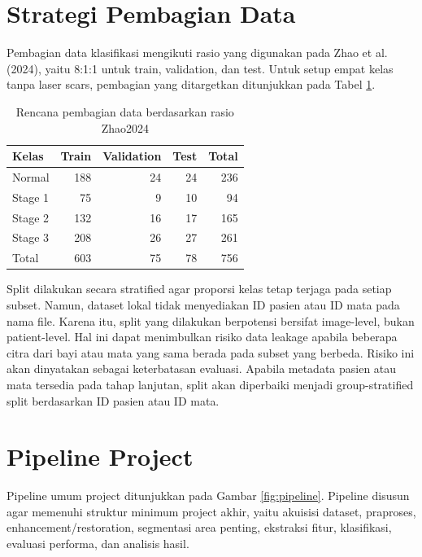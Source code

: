 \documentclass[12pt,a4paper]{article}
\begin{document}
\section*{Strategi Pembagian Data}

Pembagian data klasifikasi mengikuti rasio yang digunakan pada Zhao et al. (2024), yaitu 8:1:1 untuk train, validation, dan test. Untuk setup empat kelas tanpa laser scars, pembagian yang ditargetkan ditunjukkan pada Tabel \ref{tab:split}.

\begin{table}[h]
\centering
\caption{Rencana pembagian data berdasarkan rasio Zhao2024}
\label{tab:split}
\begin{tabular}{l r r r r}
\toprule
\textbf{Kelas} & \textbf{Train} & \textbf{Validation} & \textbf{Test} & \textbf{Total} \\
\midrule
Normal & 188 & 24 & 24 & 236 \\
Stage 1 & 75 & 9 & 10 & 94 \\
Stage 2 & 132 & 16 & 17 & 165 \\
Stage 3 & 208 & 26 & 27 & 261 \\
\midrule
Total & 603 & 75 & 78 & 756 \\
\bottomrule
\end{tabular}
\end{table}

Split dilakukan secara stratified agar proporsi kelas tetap terjaga pada setiap subset. Namun, dataset lokal tidak menyediakan ID pasien atau ID mata pada nama file. Karena itu, split yang dilakukan berpotensi bersifat image-level, bukan patient-level. Hal ini dapat menimbulkan risiko data leakage apabila beberapa citra dari bayi atau mata yang sama berada pada subset yang berbeda. Risiko ini akan dinyatakan sebagai keterbatasan evaluasi. Apabila metadata pasien atau mata tersedia pada tahap lanjutan, split akan diperbaiki menjadi group-stratified split berdasarkan ID pasien atau ID mata.

\section*{Pipeline Project}

Pipeline umum project ditunjukkan pada Gambar \ref{fig:pipeline}. Pipeline disusun agar memenuhi struktur minimum project akhir, yaitu akuisisi dataset, praproses, enhancement/restoration, segmentasi area penting, ekstraksi fitur, klasifikasi, evaluasi performa, dan analisis hasil.
\end{document}
